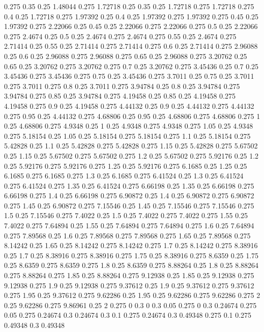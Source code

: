 0.275 0.35
0.25 1.48044
0.275 1.72718
0.25 0.35
0.25 1.72718
0.275 1.72718
0.275 0.4
0.25 1.72718
0.275 1.97392
0.25 0.4
0.25 1.97392
0.275 1.97392
0.275 0.45
0.25 1.97392
0.275 2.22066
0.25 0.45
0.25 2.22066
0.275 2.22066
0.275 0.5
0.25 2.22066
0.275 2.4674
0.25 0.5
0.25 2.4674
0.275 2.4674
0.275 0.55
0.25 2.4674
0.275 2.71414
0.25 0.55
0.25 2.71414
0.275 2.71414
0.275 0.6
0.25 2.71414
0.275 2.96088
0.25 0.6
0.25 2.96088
0.275 2.96088
0.275 0.65
0.25 2.96088
0.275 3.20762
0.25 0.65
0.25 3.20762
0.275 3.20762
0.275 0.7
0.25 3.20762
0.275 3.45436
0.25 0.7
0.25 3.45436
0.275 3.45436
0.275 0.75
0.25 3.45436
0.275 3.7011
0.25 0.75
0.25 3.7011
0.275 3.7011
0.275 0.8
0.25 3.7011
0.275 3.94784
0.25 0.8
0.25 3.94784
0.275 3.94784
0.275 0.85
0.25 3.94784
0.275 4.19458
0.25 0.85
0.25 4.19458
0.275 4.19458
0.275 0.9
0.25 4.19458
0.275 4.44132
0.25 0.9
0.25 4.44132
0.275 4.44132
0.275 0.95
0.25 4.44132
0.275 4.68806
0.25 0.95
0.25 4.68806
0.275 4.68806
0.275 1
0.25 4.68806
0.275 4.9348
0.25 1
0.25 4.9348
0.275 4.9348
0.275 1.05
0.25 4.9348
0.275 5.18154
0.25 1.05
0.25 5.18154
0.275 5.18154
0.275 1.1
0.25 5.18154
0.275 5.42828
0.25 1.1
0.25 5.42828
0.275 5.42828
0.275 1.15
0.25 5.42828
0.275 5.67502
0.25 1.15
0.25 5.67502
0.275 5.67502
0.275 1.2
0.25 5.67502
0.275 5.92176
0.25 1.2
0.25 5.92176
0.275 5.92176
0.275 1.25
0.25 5.92176
0.275 6.1685
0.25 1.25
0.25 6.1685
0.275 6.1685
0.275 1.3
0.25 6.1685
0.275 6.41524
0.25 1.3
0.25 6.41524
0.275 6.41524
0.275 1.35
0.25 6.41524
0.275 6.66198
0.25 1.35
0.25 6.66198
0.275 6.66198
0.275 1.4
0.25 6.66198
0.275 6.90872
0.25 1.4
0.25 6.90872
0.275 6.90872
0.275 1.45
0.25 6.90872
0.275 7.15546
0.25 1.45
0.25 7.15546
0.275 7.15546
0.275 1.5
0.25 7.15546
0.275 7.4022
0.25 1.5
0.25 7.4022
0.275 7.4022
0.275 1.55
0.25 7.4022
0.275 7.64894
0.25 1.55
0.25 7.64894
0.275 7.64894
0.275 1.6
0.25 7.64894
0.275 7.89568
0.25 1.6
0.25 7.89568
0.275 7.89568
0.275 1.65
0.25 7.89568
0.275 8.14242
0.25 1.65
0.25 8.14242
0.275 8.14242
0.275 1.7
0.25 8.14242
0.275 8.38916
0.25 1.7
0.25 8.38916
0.275 8.38916
0.275 1.75
0.25 8.38916
0.275 8.6359
0.25 1.75
0.25 8.6359
0.275 8.6359
0.275 1.8
0.25 8.6359
0.275 8.88264
0.25 1.8
0.25 8.88264
0.275 8.88264
0.275 1.85
0.25 8.88264
0.275 9.12938
0.25 1.85
0.25 9.12938
0.275 9.12938
0.275 1.9
0.25 9.12938
0.275 9.37612
0.25 1.9
0.25 9.37612
0.275 9.37612
0.275 1.95
0.25 9.37612
0.275 9.62286
0.25 1.95
0.25 9.62286
0.275 9.62286
0.275 2
0.25 9.62286
0.275 9.86961
0.25 2
0.275 0
0.3 0
0.3 0.05
0.275 0
0.3 0.24674
0.275 0.05
0.275 0.24674
0.3 0.24674
0.3 0.1
0.275 0.24674
0.3 0.49348
0.275 0.1
0.275 0.49348
0.3 0.49348

